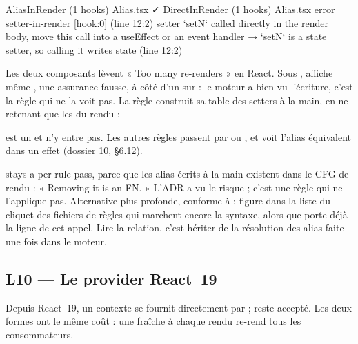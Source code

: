 \begin{sortie}
  AliasInRender  (1 hooks)  Alias.tsx  ✓
  DirectInRender  (1 hooks)  Alias.tsx
    error  setter-in-render  [hook:0]  (line 12:2)  setter `setN` called directly in the render body, move this call into a useEffect or an event handler
       → `setN` is a state setter, so calling it writes state (line 12:2)
\end{sortie}

Les deux composants lèvent « Too many re-renders » en React. Sous ,  affiche même , une assurance fausse, à côté d'un  sur  : le moteur a bien vu l'écriture, c'est la règle qui ne la voit pas. La règle construit sa table des setters à la main, en ne retenant que les  du rendu :


 est un  et n'y entre pas. Les autres règles passent par  ou , et  voit l'alias équivalent dans un effet (dossier 10, §6.12).

\begin{decision}
\og {} stays a per-rule pass\fg{}, parce que les alias écrits à la main existent dans le CFG de rendu : « Removing it is an FN. » L'ADR a vu le risque ; c'est une règle qui ne l'applique pas. Alternative plus profonde, conforme à  :  figure dans la liste du cliquet  des fichiers de règles qui marchent encore la syntaxe, alors que  porte déjà la ligne  de cet appel. Lire la relation, c'est hériter de la résolution des alias faite une fois dans le moteur.
\end{decision}

\subsection{L10 --- Le provider React~19}

\begin{react}
Depuis React~19, un contexte se fournit directement par  ;  reste accepté. Les deux formes ont le même coût : une  fraîche à chaque rendu re-rend tous les consommateurs.
\end{react}

